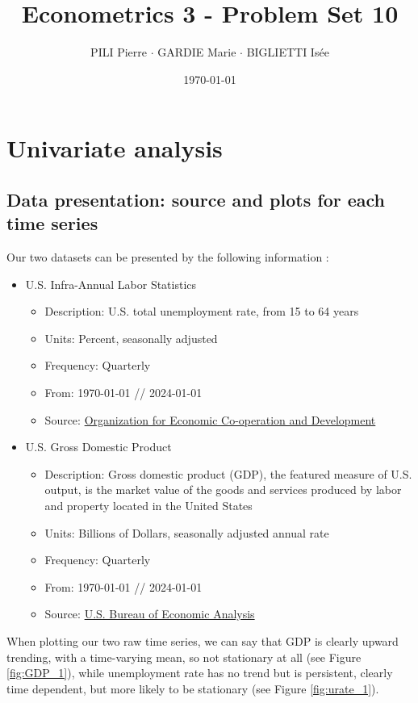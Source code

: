 \documentclass[12pt]{article}
\title{Econometrics 3 - Problem Set 10}
\author{PILI Pierre $\cdot$ GARDIE Marie $\cdot$ BIGLIETTI Isée}
\date{\today}
\begin{document}
\maketitle

\section{Univariate analysis}
\subsection{Data presentation: source and plots for each time series}
Our two datasets can be presented by the following information : 
\begin{itemize}
    \item U.S. Infra-Annual Labor Statistics
    \begin{itemize}
        \item Description: U.S. total unemployment rate, from 15 to 64 years
        \item Units: Percent, seasonally adjusted
        \item Frequency: Quarterly
        \item From: 1970-01-01 // 2024-01-01
        \item Source: \href{https://www.oecd.org}{Organization for Economic Co-operation and Development}
    \end{itemize}
    \item U.S. Gross Domestic Product
    \begin{itemize}
        \item Description: Gross domestic product (GDP), the featured measure of U.S. output, is the market value of the goods and services 
        produced by labor and property located in the United States
        \item Units: Billions of Dollars, seasonally adjusted annual rate
        \item Frequency: Quarterly
        \item From: 1970-01-01 // 2024-01-01
        \item Source: \href{https://www.bea.gov}{U.S. Bureau of Economic Analysis}
    \end{itemize}
\end{itemize}

When plotting our two raw time series, we can say that GDP is clearly upward trending, with a time-varying mean, so not stationary at all 
(see Figure \ref*{fig:GDP_1}), while unemployment rate has no trend but is persistent, clearly time dependent, but more likely to be stationary
(see Figure \ref*{fig:urate_1}).\\
\end{document}
